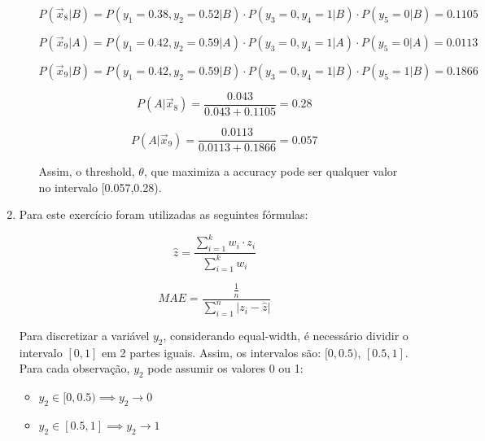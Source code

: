 \documentclass[a4paper,12pt]{article} %
\begin{document}
\begin{enumerate}
\begin{enumerate}
\begin{equation*}
    P(\vec{x}_8|B) = P(y_1=0.38,y_2=0.52|B) \cdot P(y_3=0,y_4=1|B) \cdot P(y_5=0|B) = 0.1105
\end{equation*}

\begin{equation*}
    P(\vec{x}_9|A) = P(y_1=0.42,y_2=0.59|A) \cdot P(y_3=0,y_4=1|A) \cdot P(y_5=0|A) = 0.0113
\end{equation*}


\begin{equation*}
    P(\vec{x}_9|B) = P(y_1=0.42,y_2=0.59|B) \cdot P(y_3=0,y_4=1|B) \cdot P(y_5=1|B) = 0.1866
\end{equation*}

\begin{equation*}
    P(A|\vec{x}_8) = \frac{0.043}{0.043+0.1105} = 0.28
\end{equation*}

\begin{equation*}
    P(A|\vec{x}_9) = \frac{0.0113}{0.0113+0.1866} = 0.057
\end{equation*}

Assim, o threshold, $\theta$, que maximiza a accuracy pode ser qualquer valor no intervalo [0.057,0.28).

\end{enumerate}

\item
Para este exercício foram utilizadas as seguintes fórmulas:

\begin{equation}
    \hat{z} = \frac{\sum_{i=1}^{k} w_i \cdot z_{i}}{\sum_{i=1}^{k} w_i}
\end{equation}

\begin{equation}
    MAE = \frac{\frac{1}{n}}{\sum_{i=1}^{n} |z_i - \hat{z}|}
\end{equation}

Para discretizar a variável $y_2$, considerando equal-width, é necessário dividir o intervalo $[0,1]$ em 2 partes iguais. 
Assim, os intervalos são: $[0,0.5)$, $[0.5,1]$. \\

Para cada observação, $y_2$ pode assumir os valores 0 ou 1: 
\begin{itemize}
    \item $y_2 \in [0,0.5) \implies y_2 \rightarrow 0$ 
    \item $y_2 \in [0.5,1] \implies y_2 \rightarrow 1$ 


\end{itemize}
\end{enumerate}
\end{document}
